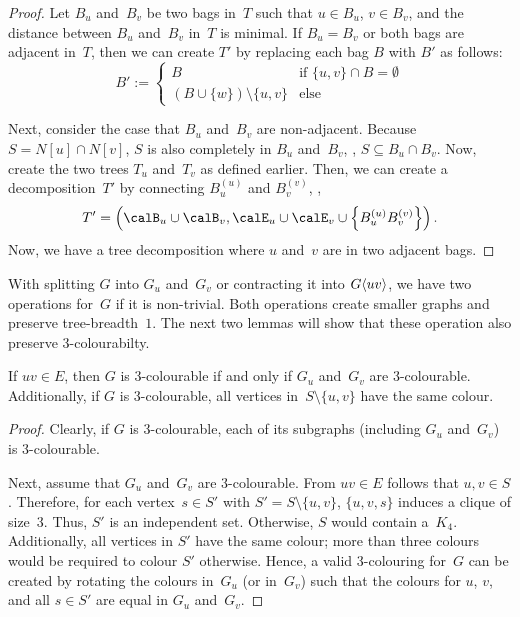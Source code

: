 \begin{proof}
Let $B_u$ and~$B_v$ be two bags in~$T$ such that $u \in B_u$, $v \in B_v$, and the distance between $B_u$ and~$B_v$ in~$T$ is minimal.
If $B_u = B_v$ or both bags are adjacent in~$T$, then we can create $T'$ by replacing each bag $B$ with $B'$ as follows:
\[
    B' :=
    \begin{cases}
        B & \text{if $\{ u, v \} \cap B = \emptyset$} \\
        (B \cup \{ w \}) \setminus \{ u, v \} & \text{else}
    \end{cases}
\]

Next, consider the case that $B_u$ and~$B_v$ are non-adjacent.
Because $S = N[u] \cap N[v]$, $S$ is also completely in $B_u$ and~$B_v$, \ie, $S \subseteq B_u \cap B_v$.
Now, create the two trees $T_u$ and~$T_v$ as defined earlier.
Then, we can create a decomposition~$T'$ by connecting $B^{(u)}_u$ and $B^{(v)}_v$, \ie,
\[
    T' = \left ( \calB_u \cup \calB_v, \calE_u \cup \calE_v \cup \left \{ B^{(u)}_uB^{(v)}_v \right \} \right ).
\]
Now, we have a tree decomposition where $u$ and~$v$ are in two adjacent bags.
\end{proof}

With splitting $G$ into $G_u$ and~$G_v$ or contracting it into $G \langle uv \rangle$, we have two operations for~$G$ if it is non-trivial.
Both operations create smaller graphs and preserve tree-breadth~$1$.
The next two lemmas will show that these operation also preserve 3-colourabilty.

\begin{lemma}
    \label{lem:GcolourableIffGuAndGv}
If \( uv \in E \), then \( G \) is 3-colourable if and only if \( G_u \) and~\( G_v \) are 3-colourable.
Additionally, if \( G \) is 3-colourable, all vertices in~\( S \setminus \{ u, v \} \) have the same colour.
\end{lemma}

\begin{proof}
Clearly, if $G$ is 3-colourable, each of its subgraphs (including $G_u$ and~$G_v$) is 3-colourable.

Next, assume that $G_u$ and~$G_v$ are 3-colourable.
From $uv \in E$ follows that $u,v \in S$.
Therefore, for each vertex~$s \in S'$ with $S' = S \setminus \{ u, v \}$, $\{ u, v, s \}$ induces a clique of size~$3$.
Thus, $S'$ is an independent set.
Otherwise, $S$ would contain a~$K_4$.
Additionally, all vertices in $S'$ have the same colour; more than three colours would be required to colour $S'$ otherwise.
Hence, a valid 3-colouring for~$G$ can be created by rotating the colours in~$G_u$ (or in~$G_v$) such that the colours for $u$, $v$, and all $s \in S'$ are equal in $G_u$ and~$G_v$.
\end{proof}

